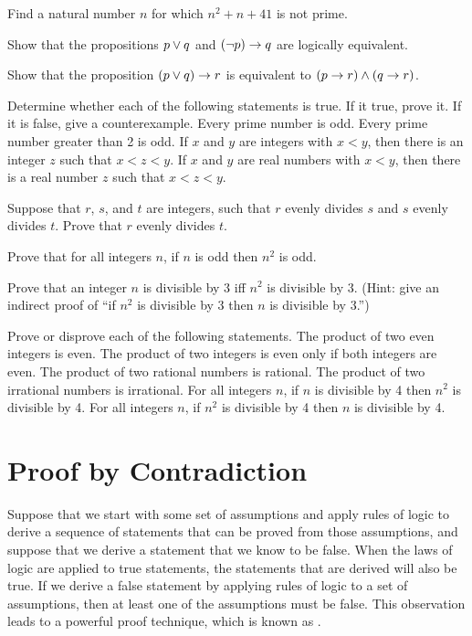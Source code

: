 \begin{exercises}

\problem Find a natural number $n$ for which $n^2+n+41$ is not prime.

\problem Show that the propositions $p\vee q$ and $(\lnot p)\rightarrow q$
are logically equivalent.

\problem Show that the proposition $(p\vee q)\rightarrow r$ is equivalent
to $(p\rightarrow r)\wedge(q\rightarrow r)$.

\problem Determine whether each of the following statements is
true.  If it true, prove it.  If it is false, give a counterexample.
\ppart Every prime number is odd.
\ppart Every prime number greater than 2 is odd.
\ppart If $x$ and $y$ are integers with $x<y$, then there is an integer
$z$ such that $x<z<y$.
\ppart If $x$ and $y$ are real numbers with $x<y$, then there is a real number
$z$ such that $x<z<y$.

\problem Suppose that $r$, $s$, and $t$ are integers, such that $r$ evenly divides $s$ and
$s$ evenly divides $t$.  Prove that $r$ evenly divides $t$.

\problem Prove that for all integers $n$, if $n$ is odd then $n^2$ is odd.

\problem\label{divby3}Prove that an integer $n$ is divisible by 3 iff $n^2$ is divisible
by 3.  (Hint: give an indirect proof of ``if $n^2$ is divisible by 3 then
$n$ is divisible by 3.'')

\problem Prove or disprove each of the following statements.
\ppart The product of two even integers is even.
\ppart The product of two integers is even only if both integers are even.
\ppart The product of two rational numbers is rational.
\ppart The product of two irrational numbers is irrational.
\ppart For all integers $n$, if $n$ is divisible by 4 then $n^2$ is
divisible by 4.
\ppart For all integers $n$, if $n^2$ is divisible by 4 then $n$ is
divisible by 4.

\end{exercises}


\section{Proof by Contradiction}

Suppose that we start with some set of assumptions and apply rules
of logic to derive a sequence of statements that can be proved from
those assumptions, and suppose that we derive a statement that we
know to be false.  When the laws of logic are applied to true
statements, the statements that are derived will also be true.
If we derive a false statement by applying rules of logic to a set
of assumptions, then at least one of the assumptions must be false.
This observation leads to a powerful proof technique, which
is known as .

